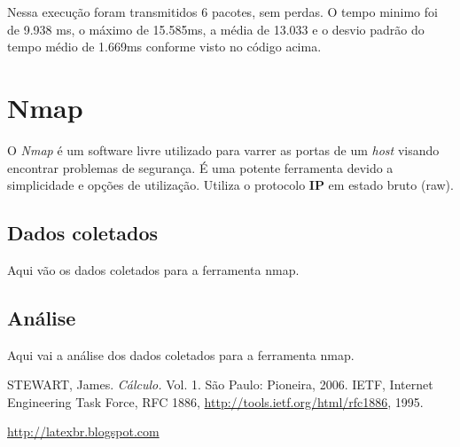 \documentclass[a4paper]{report} %
\begin{document}
Nessa execução foram transmitidos 6 pacotes, sem perdas. O tempo minimo foi de 9.938 ms, o máximo de 15.585ms, a média de 13.033 e o desvio padrão do tempo médio de 1.669ms conforme visto no código acima.

\section{Nmap}
\label{sec_nmap}
O \textit{Nmap} é um software livre utilizado para varrer as portas de um \textit{host} visando encontrar problemas de segurança. É uma potente ferramenta devido a simplicidade e opções de utilização. Utiliza o protocolo \textbf{IP} em estado bruto (raw).


\subsection{Dados coletados}
\label{sub_nmap_dados}
Aqui vão os dados coletados para a ferramenta nmap.

\subsection{Análise}
\label{sub_nmap_analise}
Aqui vai a análise dos dados coletados para a ferramenta nmap.

\begin{thebibliography}{99}
 STEWART, James. {\sl C\'alculo.} Vol. 1. S\~ao Paulo: Pioneira, 2006.
 IETF, Internet Engineering Task Force, RFC 1886, \url{http://tools.ietf.org/html/rfc1886}, 1995.

\url{http://latexbr.blogspot.com}
\end{thebibliography}

\end{document}
